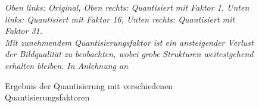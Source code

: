 \begin{appendices}
\begin{figure}[h!]
    \caption{Ergebnis der Quantisierung mit verschiedenen Quantisierungsfaktoren}
    \textit{Oben links: Original, Oben rechts: Quantisiert mit Faktor 1, Unten links: Quantisiert mit Faktor 16, Unten rechts: Quantisiert mit Faktor 31.\\
    Mit zunehmendem Quantisierungsfaktor ist ein ansteigender Verlust der Bildqualität zu beobachten, wobei grobe Strukturen weitestgehend erhalten bleiben. In Anlehnung an \cite{brooke_cagle__2016}}
    \label{fig:chroma_artefacts}
\end{figure}
\end{appendices}
